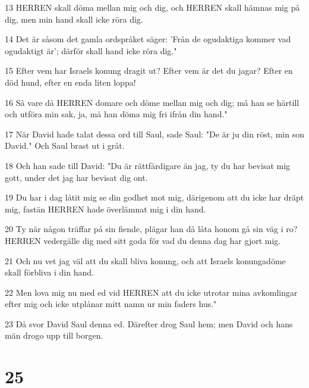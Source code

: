 \par 13 HERREN skall döma mellan mig och dig, och HERREN skall hämnas mig på dig, men min hand skall icke röra dig.
\par 14 Det är såsom det gamla ordspråket säger: 'Från de ogudaktiga kommer vad ogudaktigt är'; därför skall hand icke röra dig."
\par 15 Efter vem har Israels konung dragit ut? Efter vem är det du jagar? Efter en död hund, efter en enda liten loppa!
\par 16 Så vare då HERREN domare och döme mellan mig och dig; må han se härtill och utföra min sak, ja, må han döma mig fri ifrån din hand."
\par 17 När David hade talat dessa ord till Saul, sade Saul: "De är ju din röst, min son David." Och Saul brast ut i gråt.
\par 18 Och han sade till David: "Du är rättfärdigare än jag, ty du har bevisat mig gott, under det jag har bevisat dig ont.
\par 19 Du har i dag låtit mig se din godhet mot mig, därigenom att du icke har dräpt mig, fastän HERREN hade överlämnat mig i din hand.
\par 20 Ty när någon träffar på sin fiende, plägar han då låta honom gå sin väg i ro? HERREN vedergälle dig med sitt goda för vad du denna dag har gjort mig.
\par 21 Och nu vet jag väl att du skall bliva konung, och att Israels konungadöme skall förbliva i din hand.
\par 22 Men lova mig nu med ed vid HERREN att du icke utrotar mina avkomlingar efter mig och icke utplånar mitt namn ur min faders hus."
\par 23 Då svor David Saul denna ed. Därefter drog Saul hem; men David och hans män drogo upp till borgen.

\chapter{25}

